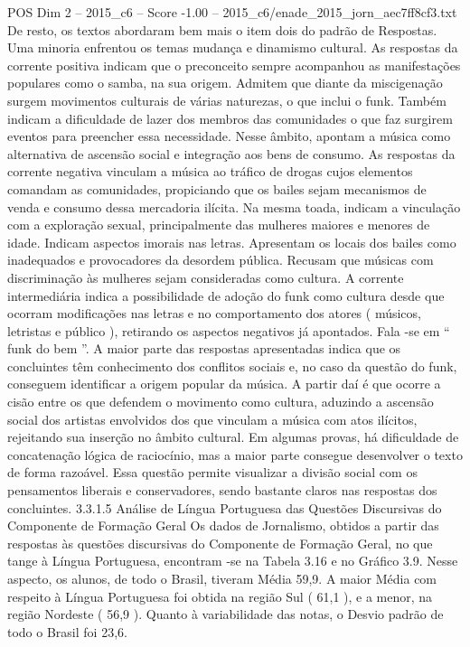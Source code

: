 \begin{textsample}{POS Dim 2 – 2015\_c6 – Score -1.00 – 2015\_c6/enade\_2015\_jorn\_aec7ff8cf3.txt}
De resto, os textos abordaram bem mais o item dois do padrão de Respostas.
Uma minoria enfrentou os temas mudança e dinamismo cultural.
As respostas da corrente positiva indicam que o preconceito sempre acompanhou as manifestações populares como o samba, na sua origem.
Admitem que diante da miscigenação surgem movimentos culturais de várias naturezas, o que inclui o funk.
Também indicam a dificuldade de lazer dos membros das comunidades o que faz surgirem eventos para preencher essa necessidade.
Nesse âmbito, apontam a música como alternativa de ascensão social e integração aos bens de consumo.
As respostas da corrente negativa vinculam a música ao tráfico de drogas cujos elementos comandam as comunidades, propiciando que os bailes sejam mecanismos de venda e consumo dessa mercadoria ilícita.
Na mesma toada, indicam a vinculação com a exploração sexual, principalmente das mulheres maiores e menores de idade.
Indicam aspectos imorais nas letras.
Apresentam os locais dos bailes como inadequados e provocadores da desordem pública.
Recusam que músicas com discriminação às mulheres sejam consideradas como cultura.
A corrente intermediária indica a possibilidade de adoção do funk como cultura desde que ocorram modificações nas letras e no comportamento dos atores ( músicos, letristas e público ), retirando os aspectos negativos já apontados.
Fala -se em “ funk do bem ”.
A maior parte das respostas apresentadas indica que os concluintes têm conhecimento dos conflitos sociais e, no caso da questão do funk, conseguem identificar a origem popular da música.
A partir daí é que ocorre a cisão entre os que defendem o movimento como cultura, aduzindo a ascensão social dos artistas envolvidos dos que vinculam a música com atos ilícitos, rejeitando sua inserção no âmbito cultural.
Em algumas provas, há dificuldade de concatenação lógica de raciocínio, mas a maior parte consegue desenvolver o texto de forma razoável.
Essa questão permite visualizar a divisão social com os pensamentos liberais e conservadores, sendo bastante claros nas respostas dos concluintes. 3.3.1.5 Análise de Língua Portuguesa das Questões Discursivas do Componente de Formação Geral Os dados de Jornalismo, obtidos a partir das respostas às questões discursivas do Componente de Formação Geral, no que tange à Língua Portuguesa, encontram -se na Tabela 3.16 e no Gráfico 3.9.
Nesse aspecto, os alunos, de todo o Brasil, tiveram Média 59,9.
A maior Média com respeito à Língua Portuguesa foi obtida na região Sul ( 61,1 ), e a menor, na região Nordeste ( 56,9 ).
Quanto à variabilidade das notas, o Desvio padrão de todo o Brasil foi 23,6.

\end{textsample}
